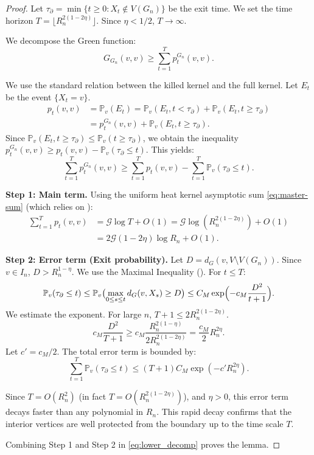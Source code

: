 \documentclass{article}
\numberwithin{equation}{section}
\theoremstyle{definition}
\theoremstyle{remark}
\newcommand{\cG}{\mathcal{G}}
\newcommand{\Prob}{\mathbb{P}}
\begin{document}
\begin{proof}
Let $\tau_{\partial} = \min\{t \geq 0 : X_t \notin V(G_n)\}$ be the exit time. We set the time horizon $T = \lfloor R_n^{2(1-2\eta)} \rfloor$. Since $\eta < 1/2$, $T \to \infty$.

We decompose the Green function:
\[
G_{G_n}(v,v) \geq \sum_{t=1}^{T} p_t^{G_n}(v,v).
\]

We use the standard relation between the killed kernel and the full kernel. Let $E_t$ be the event $\{X_t = v\}$.
\begin{align*}
p_t(v,v) &= \Prob_v(E_t) = \Prob_v(E_t, t < \tau_{\partial}) + \Prob_v(E_t, t \geq \tau_{\partial}) \\
&= p_t^{G_n}(v,v) + \Prob_v(E_t, t \geq \tau_{\partial}).
\end{align*}
Since $\Prob_v(E_t, t \geq \tau_{\partial}) \leq \Prob_v(t \geq \tau_{\partial})$, we obtain the inequality $p_t^{G_n}(v,v) \geq p_t(v,v) - \Prob_v(\tau_{\partial} \leq t)$. This yields:
\begin{equation}\label{eq:lower_decomp}
\sum_{t=1}^{T} p_t^{G_n}(v,v) \geq \sum_{t=1}^{T} p_t(v,v) - \sum_{t=1}^{T} \Prob_v(\tau_{\partial} \leq t).
\end{equation}

\textbf{Step 1: Main term.} Using the uniform heat kernel asymptotic sum \eqref{eq:master-sum} (which relies on ):
\begin{align*}
\sum_{t=1}^{T} p_t(v,v) &= \cG \log T + O(1)
  = \cG \log(R_n^{2(1-2\eta)}) + O(1) \\
&= 2\cG (1-2\eta)\log R_n + O(1).
\end{align*}

\textbf{Step 2: Error term (Exit probability).} Let $D = d_G(v, V \setminus V(G_n))$. Since $v \in I_n$, $D > R_n^{1-\eta}$. We use the Maximal Inequality (). For $t \leq T$:
\[
\Prob_v(\tau_{\partial} \leq t) \leq \Prob_v\bigl( \max_{0 \leq s \leq t} d_G(v,X_s) \geq D \bigr) \leq C_M \exp\Bigl(-c_M \frac{D^2}{t+1}\Bigr).
\]
We estimate the exponent. For large $n$, $T+1 \leq 2 R_n^{2(1-2\eta)}$.
\[
c_M \frac{D^2}{T+1} \geq c_M \frac{R_n^{2(1-\eta)}}{2 R_n^{2(1-2\eta)}} = \frac{c_M}{2} R_n^{2\eta}.
\]
Let $c' = c_M/2$. The total error term is bounded by:
\[
\sum_{t=1}^T \Prob_v(\tau_{\partial} \leq t) \leq (T+1) C_M \exp(-c' R_n^{2\eta}).
\]

Since $T = O(R_n^2)$ (in fact $T=O(R_n^{2(1-2\eta)})$), and $\eta>0$, this error term decays faster than any polynomial in $R_n$. This rapid decay confirms that the interior vertices are well protected from the boundary up to the time scale $T$.

Combining Step 1 and Step 2 in \eqref{eq:lower_decomp} proves the lemma.
\end{proof}
\end{document}
